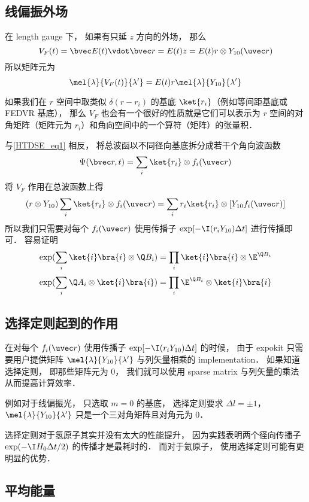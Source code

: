 \subsection{线偏振外场}
在 length gauge 下， 如果有只延 $z$ 方向的外场， 那么
\begin{equation}
V_F(t) = \bvec E(t) \vdot \bvec r =  E(t) z = E(t) r \otimes Y_{10}(\uvec r)
\end{equation}
所以矩阵元为
\begin{equation}
\mel{\lambda}{V_F(t)}{\lambda'} =  E(t) r \mel{\lambda}{Y_{10}}{\lambda'}
\end{equation}

如果我们在 $r$ 空间中取类似 $\delta(r - r_i)$ 的基底 $\ket{r_i}$（例如等间距基底或 FEDVR 基底）， 那么 $V_F$ 也会有一个很好的性质就是它们可以表示为 $r$ 空间的对角矩阵（矩阵元为 $r_i$）和角向空间中的一个算符（矩阵）的张量积． 

与\autoref{HTDSE_eq1} 相反， 将总波函以不同径向基底拆分成若干个角向波函数
\begin{equation}
\Psi(\bvec r, t) = \sum_i \ket{r_i} \otimes f_i(\uvec r)
\end{equation}
将 $V_F$ 作用在总波函数上得
\begin{equation}
(r \otimes Y_{10})\sum_i \ket{r_i} \otimes f_i(\uvec r)
= \sum_i r_i\ket{r_i} \otimes [Y_{10} f_i(\uvec r)]
\end{equation}
所以我们只需要对每个 $f_i(\uvec r)$ 使用传播子 $\exp[-\I (r_i Y_{10}) \Delta t]$ 进行传播即可． 容易证明%
\begin{equation}
\exp(\sum_i \ket{i}\bra{i} \otimes \Q B_i) = \prod_i \ket{i}\bra{i} \otimes  \E^{\Q B_i}
\end{equation}
\begin{equation}
\exp(\sum_i  \Q A_i \otimes \ket{i}\bra{i}) = \prod_i  \E^{\Q B_i} \otimes \ket{i}\bra{i}
\end{equation}

\subsection{选择定则起到的作用}
在对每个 $f_i(\uvec r)$ 使用传播子 $\exp[-\I (r_i Y_{10}) \Delta t]$ 的时候， 由于 expokit 只需要用户提供矩阵 $\mel{\lambda}{Y_{10}}{\lambda'}$ 与列矢量相乘的 implementation． 如果知道选择定则， 即那些矩阵元为 0， 我们就可以使用 sparse matrix 与列矢量的乘法从而提高计算效率．

例如对于线偏振光， 只选取 $m = 0$ 的基底， 选择定则要求 $\Delta l = \pm 1$， $\mel{\lambda}{Y_{10}}{\lambda'}$ 只是一个三对角矩阵且对角元为 0．

选择定则对于氢原子其实并没有太大的性能提升， 因为实践表明两个径向传播子 $\exp(-\I H_0 \Delta t/2)$ 的传播才是最耗时的． 而对于氦原子， 使用选择定则可能有更明显的优势．


\subsection{平均能量}

